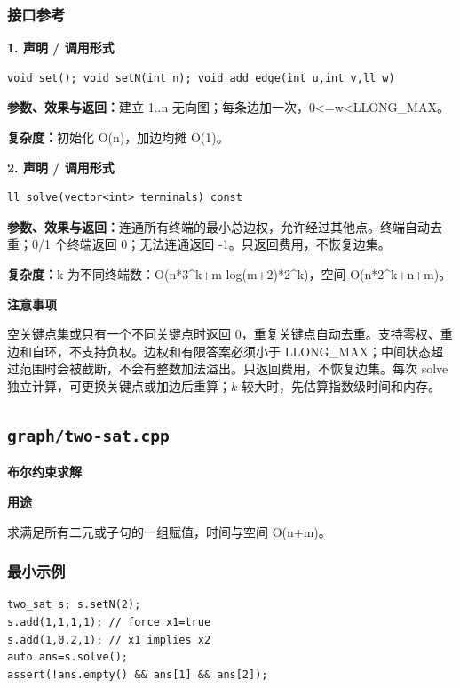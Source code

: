 \documentclass[UTF8,a4paper,10pt]{ctexart}
\newcommand{\TemplUsage}[1]{\textbf{用途}\par #1\par}
\newcommand{\TemplNote}[1]{\textbf{注意事项}\par #1\par}
\begin{document}
\subsubsection*{接口参考}
\noindent\begin{minipage}{\textwidth}
\textbf{1. 声明 / 调用形式}
\begin{lstlisting}
void set(); void setN(int n); void add_edge(int u,int v,ll w)
\end{lstlisting}
\textbf{参数、效果与返回：}建立 1..n 无向图；每条边加一次，0<=w<LLONG\_MAX。

\textbf{复杂度：}初始化 O(n)，加边均摊 O(1)。

\end{minipage}\par\vspace{0.4em}
\noindent\begin{minipage}{\textwidth}
\textbf{2. 声明 / 调用形式}
\begin{lstlisting}
ll solve(vector<int> terminals) const
\end{lstlisting}
\textbf{参数、效果与返回：}连通所有终端的最小总边权，允许经过其他点。终端自动去重；0/1 个终端返回 0；无法连通返回 -1。只返回费用，不恢复边集。

\textbf{复杂度：}k 为不同终端数：O(n*3\textasciicircum{}k+m log(m+2)*2\textasciicircum{}k)，空间 O(n*2\textasciicircum{}k+n+m)。

\TemplNote{空关键点集或只有一个不同关键点时返回 0，重复关键点自动去重。支持零权、重边和自环，不支持负权。边权和有限答案必须小于 LLONG\_MAX；中间状态超过范围时会被截断，不会有整数加法溢出。只返回费用，不恢复边集。每次 solve 独立计算，可更换关键点或加边后重算；$k$ 较大时，先估算指数级时间和内存。}
\end{minipage}\par\vspace{0.4em}
\clearpage
\subsection{\texttt{graph/two-sat.cpp}}
\textbf{布尔约束求解}\par
\TemplUsage{求满足所有二元或子句的一组赋值，时间与空间 O(n+m)。}
\subsubsection*{最小示例}
\begin{lstlisting}
two_sat s; s.setN(2);
s.add(1,1,1,1); // force x1=true
s.add(1,0,2,1); // x1 implies x2
auto ans=s.solve();
assert(!ans.empty() && ans[1] && ans[2]);
\end{lstlisting}
\end{document}

